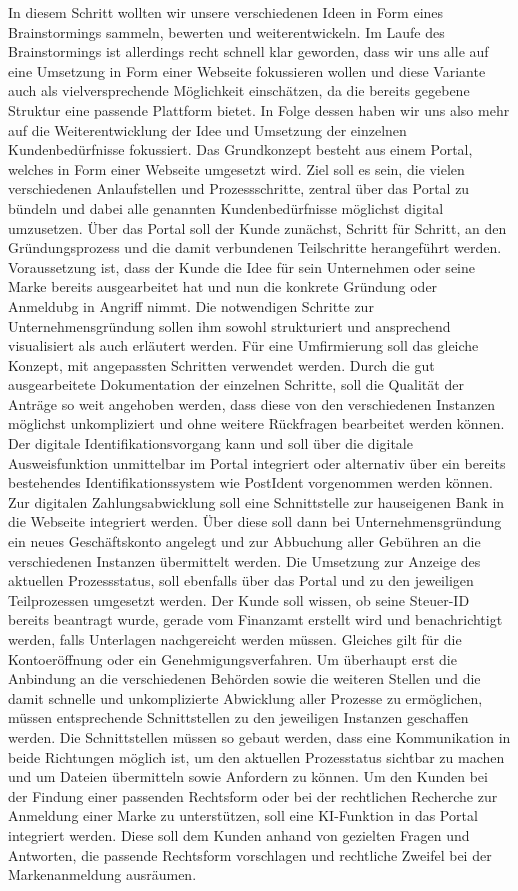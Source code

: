 In diesem Schritt wollten wir unsere verschiedenen Ideen in Form eines Brainstormings sammeln, bewerten und weiterentwickeln.
Im Laufe des Brainstormings ist allerdings recht schnell klar geworden, dass wir uns alle auf eine Umsetzung in Form einer Webseite fokussieren wollen und diese Variante auch als vielversprechende Möglichkeit einschätzen, da die bereits gegebene Struktur eine passende Plattform bietet.
In Folge dessen haben wir uns also mehr auf die Weiterentwicklung der Idee und Umsetzung der einzelnen Kundenbedürfnisse fokussiert.
Das Grundkonzept besteht aus einem Portal, welches in Form einer Webseite umgesetzt wird. Ziel soll es sein, die vielen verschiedenen Anlaufstellen und Prozessschritte, zentral über das Portal zu bündeln und dabei alle genannten Kundenbedürfnisse möglichst digital umzusetzen.
Über das Portal soll der Kunde zunächst, Schritt für Schritt, an den Gründungsprozess und die damit verbundenen Teilschritte herangeführt werden. Voraussetzung ist, dass der Kunde die Idee für sein Unternehmen oder seine Marke bereits ausgearbeitet hat und nun die konkrete Gründung oder Anmeldubg in Angriff nimmt. Die notwendigen Schritte zur Unternehmensgründung sollen ihm sowohl strukturiert und ansprechend visualisiert als auch erläutert werden. Für eine Umfirmierung soll das gleiche Konzept, mit angepassten Schritten verwendet werden.
Durch die gut ausgearbeitete Dokumentation der einzelnen Schritte, soll die Qualität der Anträge so weit angehoben werden, dass diese von den verschiedenen Instanzen möglichst unkompliziert und ohne weitere Rückfragen bearbeitet werden können.
Der digitale Identifikationsvorgang kann und soll über die digitale Ausweisfunktion unmittelbar im Portal integriert oder alternativ über ein bereits bestehendes Identifikationssystem wie PostIdent vorgenommen werden können. Zur digitalen Zahlungsabwicklung soll eine Schnittstelle zur hauseigenen Bank in die Webseite integriert werden. Über diese soll dann bei Unternehmensgründung ein neues Geschäftskonto angelegt und zur Abbuchung aller Gebühren an die verschiedenen Instanzen übermittelt werden.
Die Umsetzung zur Anzeige des aktuellen Prozessstatus, soll ebenfalls über das Portal und zu den jeweiligen Teilprozessen umgesetzt werden. Der Kunde soll wissen, ob seine Steuer-ID bereits beantragt wurde, gerade vom Finanzamt erstellt wird und benachrichtigt werden, falls Unterlagen nachgereicht werden müssen. Gleiches gilt für die Kontoeröffnung oder ein Genehmigungsverfahren.
Um überhaupt erst die Anbindung an die verschiedenen Behörden sowie die weiteren Stellen und die damit schnelle und unkomplizierte Abwicklung aller Prozesse zu ermöglichen, müssen entsprechende Schnittstellen zu den jeweiligen Instanzen geschaffen werden. Die Schnittstellen müssen so gebaut werden, dass eine Kommunikation in beide Richtungen möglich ist, um den aktuellen Prozesstatus sichtbar zu machen und um Dateien übermitteln sowie Anfordern zu können.
Um den Kunden bei der Findung einer passenden Rechtsform oder bei der rechtlichen Recherche zur Anmeldung einer Marke zu unterstützen, soll eine KI-Funktion in das Portal integriert werden. Diese soll dem Kunden anhand von gezielten Fragen und Antworten, die passende Rechtsform vorschlagen und rechtliche Zweifel bei der Markenanmeldung ausräumen.